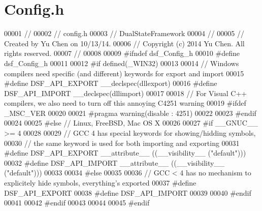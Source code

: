 \hypertarget{_config_8h_source}{}\section{Config.\+h}
\label{_config_8h_source}

\begin{DoxyCode}
00001 \textcolor{comment}{//}
00002 \textcolor{comment}{//  config.h}
00003 \textcolor{comment}{//  DualStateFramework}
00004 \textcolor{comment}{//}
00005 \textcolor{comment}{//  Created by Yu Chen on 10/13/14.}
00006 \textcolor{comment}{//  Copyright (c) 2014 Yu Chen. All rights reserved.}
00007 \textcolor{comment}{//}
00008 
00009 \textcolor{preprocessor}{#ifndef dsf\_Config\_h}
00010 \textcolor{preprocessor}{#define dsf\_Config\_h}
00011 
00012 \textcolor{preprocessor}{#if defined(\_WIN32)}
00013 
00014 \textcolor{comment}{// Windows compilers need specific (and different) keywords for export and import}
00015 \textcolor{preprocessor}{#define DSF\_API\_EXPORT \_\_declspec(dllexport)}
00016 \textcolor{preprocessor}{#define DSF\_API\_IMPORT \_\_declspec(dllimport)}
00017 
00018 \textcolor{comment}{// For Visual C++ compilers, we also need to turn off this annoying C4251 warning}
00019 \textcolor{preprocessor}{#ifdef \_MSC\_VER}
00020 
00021 \textcolor{preprocessor}{#pragma warning(disable : 4251)}
00022 
00023 \textcolor{preprocessor}{#endif}
00024 
00025 \textcolor{preprocessor}{#else // Linux, FreeBSD, Mac OS X}
00026 
00027 \textcolor{preprocessor}{#if \_\_GNUC\_\_ >= 4}
00028 
00029 \textcolor{comment}{// GCC 4 has special keywords for showing/hidding symbols,}
00030 \textcolor{comment}{// the same keyword is used for both importing and exporting}
00031 \textcolor{preprocessor}{#define DSF\_API\_EXPORT \_\_attribute\_\_ ((\_\_visibility\_\_ ("default")))}
00032 \textcolor{preprocessor}{#define DSF\_API\_IMPORT \_\_attribute\_\_ ((\_\_visibility\_\_ ("default")))}
00033 
00034 \textcolor{preprocessor}{#else}
00035 
00036 \textcolor{comment}{// GCC < 4 has no mechanism to explicitely hide symbols, everything's exported}
00037 \textcolor{preprocessor}{#define DSF\_API\_EXPORT}
00038 \textcolor{preprocessor}{#define DSF\_API\_IMPORT}
00039 
00040 \textcolor{preprocessor}{#endif}
00041 
00042 \textcolor{preprocessor}{#endif}
00043 
00044 
00045 \textcolor{preprocessor}{#endif}
\end{DoxyCode}
